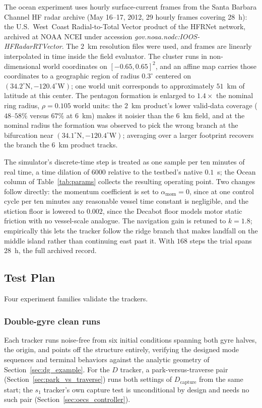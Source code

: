 \documentclass[lettersize,journal]{IEEEtran}
\begin{document}
The ocean experiment uses hourly surface-current frames from the
Santa Barbara Channel HF radar archive (May 16--17, 2012, 29 hourly
frames covering 28~h): the U.S.~West~Coast Radial-to-Total Vector
product of the HFRNet network, archived at NOAA NCEI under accession
\textit{gov.noaa.nodc:IOOS-HFRadarRTVector}. The $2$~km resolution
files were used, and frames are linearly interpolated in time inside
the field evaluator.
The cluster runs in
non-dimensional world coordinates on $[-0.65, 0.65]^2$, and an affine
map carries those coordinates to a geographic region of radius
$0.3^{\circ}$ centered on $(34.2^{\circ}\mathrm{N},
-120.4^{\circ}\mathrm{W})$; one
world unit corresponds to approximately $51$~km of latitude at this
center. The pentagon formation is enlarged to $1.4\times$ the nominal
ring radius, $\rho = 0.105$ world units: the $2$~km product's lower
valid-data coverage ($48$--$58\%$ versus $67\%$ at $6$~km) makes it
noisier than the $6$~km field, and at the nominal radius the formation
was observed to pick the wrong branch at the bifurcation near
$(34.1^{\circ}\mathrm{N}, -120.4^{\circ}\mathrm{W})$; averaging over a
larger footprint recovers the branch the $6$~km product tracks.

The simulator's discrete-time step is treated as one sample per ten
minutes of real time, a time dilation of 6000 relative to the testbed's
native $0.1$~s; the Ocean column of Table~\ref{tab:params} collects
the resulting operating point. Two changes follow directly: the
momentum coefficient is set to $\alpha_{\text{mom}} = 0$, since at one
control cycle per ten minutes any reasonable vessel time constant is
negligible, and the stiction floor is lowered to $0.002$, since the
Decabot floor models motor static friction with no vessel-scale
analogue. The navigation gain is retuned to $k = 1.8$; empirically this
lets the tracker follow the ridge branch that makes landfall on the
middle island rather than continuing east past it. With $168$ steps the
trial spans $28$~h, the full archived record.

\subsection{Test Plan}
\label{sec:test_plan}

Four experiment families validate the trackers.

\subsubsection{Double-gyre clean runs}
Each tracker runs noise-free from six initial conditions spanning both
gyre halves, the origin, and points off the structure entirely,
verifying the designed mode sequences and terminal behaviors against the
analytic geometry of Section~\ref{sec:dg_example}. For the $D$ tracker, a
park-versus-traverse pair (Section~\ref{sec:park_vs_traverse}) runs both
settings of $D_{\text{capture}}$ from the same start; the $s_1$ tracker's
own capture test is unconditional by design and needs no such pair
(Section~\ref{sec:oecs_controller}).
\end{document}
